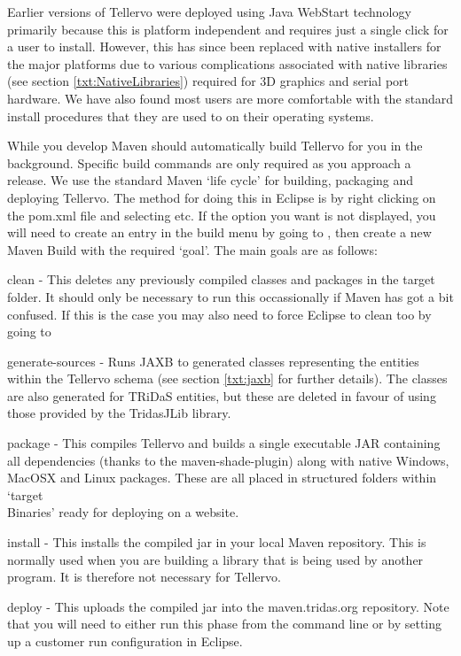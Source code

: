 Earlier versions of Tellervo were deployed using Java WebStart technology primarily because this is platform independent and requires just a single click for a user to install.  However, this has since been replaced with native installers for the major platforms due to various complications associated with native libraries (see section \ref{txt:NativeLibraries}) required for 3D graphics and serial port hardware.  We have also found most users are more comfortable with the standard install procedures that they are used to on their operating systems.

While you develop Maven should automatically build Tellervo for you in the background.  Specific build commands are only required as you approach a release.  We use the standard Maven `life cycle' for building, packaging and deploying Tellervo.  The method for doing this in Eclipse is by right clicking on the pom.xml file and selecting  etc.  If the option you want is not displayed, you will need to create an entry in the build menu by going to , then create a new Maven Build with the required `goal'.   The main goals are as follows:

\begin{description*}
 \item[clean] - This deletes any previously compiled classes and packages in the target folder.  It should only be necessary to run this occassionally if Maven has got a bit confused.  If this is the case you may also need to force Eclipse to clean too by going to 
 \item[generate-sources] - Runs JAXB to generated classes representing the entities within the Tellervo schema (see section \ref{txt:jaxb} for further details).  The classes are also generated for TRiDaS entities, but these are deleted in favour of using those provided by the TridasJLib library.
 \item[package] - This compiles Tellervo and builds a single executable JAR containing all dependencies (thanks to the maven-shade-plugin) along with native Windows, MacOSX and Linux packages.  These are all placed in structured folders within `target\\Binaries' ready for deploying on a website.  
 \item[install] - This installs the compiled jar in your local Maven repository. This is normally used when you are building a library that is being used by another program.  It is therefore not necessary for Tellervo.
 \item[deploy] - This uploads the compiled jar into the maven.tridas.org repository.  Note that you will need to either run this phase from the command line or by setting up a customer run configuration in Eclipse.
\end{description*}

